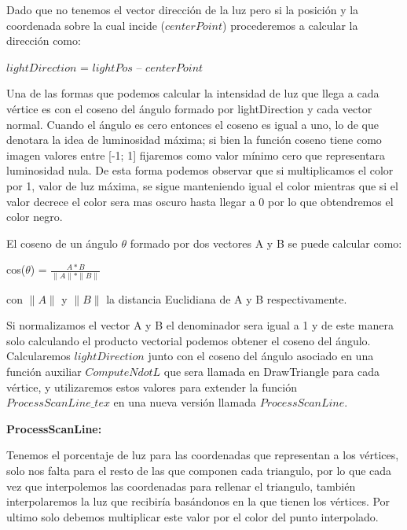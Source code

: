 \documentclass[a4paper]{article}
\newcounter{col}
\begin{document}
	Dado que no tenemos el vector dirección de la luz pero si la posición y la coordenada sobre la cual incide ($centerPoint$) procederemos a calcular la dirección como:

 $lightDirection$  = $lightPos$ – $centerPoint$


	Una de las formas que podemos calcular la intensidad de luz que llega a cada vértice es con el coseno del ángulo formado por lightDirection y cada vector normal. Cuando el ángulo es cero entonces el coseno es igual a uno, lo de que denotara la idea de luminosidad máxima; si bien la función coseno tiene como imagen valores entre [-1; 1] fijaremos como valor mínimo cero que representara luminosidad nula. De esta forma podemos observar que si multiplicamos el color por 1, valor de luz máxima, se sigue manteniendo igual el color mientras que si el valor decrece el color sera mas oscuro hasta llegar  a 0 por lo que obtendremos el color negro. 
\par El coseno de un ángulo $\theta$ formado por dos vectores A y B se puede calcular como:

cos($\theta$) = $\frac{A*B}{\parallel A \parallel*\parallel B \parallel}$ 

con $\parallel A \parallel$ y $\parallel B \parallel$ la distancia Euclidiana de A y B respectivamente.

 
Si normalizamos el vector A y B el denominador  sera igual a  1 y de este manera solo calculando el producto vectorial podemos obtener el coseno del ángulo. 
Calcularemos $lightDirection$ junto con el coseno del ángulo asociado en una función auxiliar $ComputeNdotL$ que sera llamada en DrawTriangle para cada vértice, y utilizaremos estos valores para extender la función $ProcessScanLine\_tex$ en una nueva versión llamada $ProcessScanLine$.
   
\textbf{ ProcessScanLine:}

Tenemos el porcentaje de luz para las coordenadas que representan a los vértices, solo nos falta para el resto de las que componen cada triangulo,  por lo que cada vez que interpolemos las coordenadas para rellenar el triangulo, también interpolaremos la luz que recibiría  basándonos en la que tienen los vértices. Por ultimo solo debemos multiplicar este valor por el color del punto interpolado.  
\end{document}
